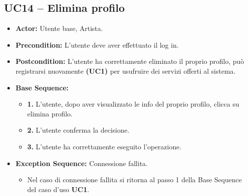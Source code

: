 \subsection{UC14 -- Elimina profilo}
\begin{itemize}
    \item \textbf{Actor:} Utente base, Artista.
    \item \textbf{Precondition:} L'utente deve aver effettuato il log in.
    \item \textbf{Postcondition:} L'utente ha correttamente eliminato il proprio profilo, può registrarsi nuovamente \textbf{(UC1)} per usufruire dei servizi offerti al sistema. 
    \item \textbf{Base Sequence:}
    \begin{itemize}
        \item \textbf{1.} L'utente, dopo aver visualizzato le info del proprio profilo, clicca su elimina profilo.
        \item \textbf{2.} L'utente conferma la decisione.
        \item \textbf{3.} L'utente ha correttamente eseguito l'operazione.
    \end{itemize}
    \item \textbf{Exception Sequence:} Connessione fallita.
    \begin{itemize}
        \item Nel caso di connessione fallita si ritorna al passo 1 della Base Sequence del caso d'uso \textbf{UC1}.
    \end{itemize}
\end{itemize}
\vspace{1cm}



\newpage

